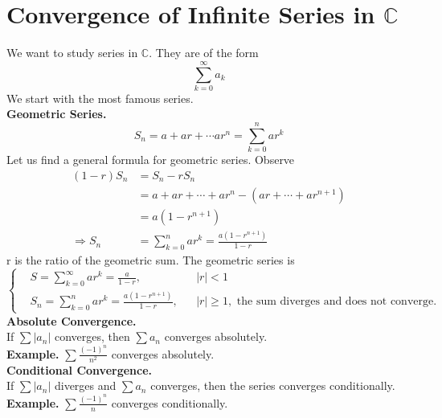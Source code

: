 \documentclass[11pt]{article}
\begin{document}
\section{Convergence of Infinite Series in $\mathbb{C}$}
We want to study series in $\mathbb{C}$. They are of the form 
$$\sum_{k = 0}^{\infty}a_k$$
We start with the most famous series. \\
\newline
\textbf{Geometric Series.}
$$S_n = a + ar + \cdots ar^n = \sum_{k = 0}^n ar^k$$
Let us find a general formula for geometric series. Observe 
\begin{align*}
(1 - r)S_n &= S_n - rS_n \\ 
&= a + ar + \cdots + ar^n - (ar + \cdots + ar^{n + 1}) \\ 
&= a(1 - r^{n + 1}) \\ 
\Longrightarrow S_n &= \sum_{k = 0}^n ar^k = \frac{a(1-r^{n + 1})}{1 - r} 
\end{align*}
r is the ratio of the geometric sum. The geometric series is 
\begin{equation*}
\left \{
  \begin{aligned}
    &S = \sum_{k = 0}^{\infty}ar^k = \frac{a}{1 - r} , && |r| < 1\\
    &S_n = \sum_{k = 0}^n ar^k = \frac{a(1-r^{n + 1})}{1 - r}, && |r| \geqslant 1, \text{ the sum diverges and does not converge.} 
  \end{aligned} \right.
\end{equation*} 
\newline
\textbf{Absolute Convergence.} \\
If $\sum {|a_n|}$ converges, then $\sum {a_n}$ converges absolutely. \\
\newline
\textbf{Example.} $\sum \frac{(-1)^n}{n^2}$ converges absolutely. \\
\newline
\textbf{Conditional Convergence.} \\
If $\sum {|a_n|}$ diverges and $\sum {a_n}$ converges, then the series converges conditionally. \\
\newline 
\textbf{Example.} $ \sum \frac{(-1)^n}{n}$ converges conditionally. \\
\newpage
\end{document}
